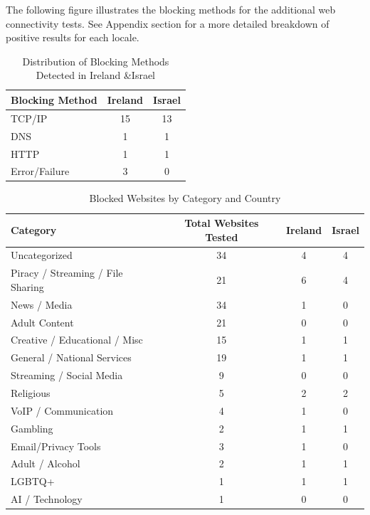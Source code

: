The following figure illustrates the blocking methods for the additional web connectivity tests. See Appendix section for a more detailed breakdown of positive results for each locale.

\begin{table}[H]
\centering
\caption{Distribution of Blocking Methods Detected in Ireland \&Israel}
\begin{tabular}{lcc}
\toprule
\textbf{Blocking Method} & \textbf{Ireland} & \textbf{Israel} \\
\midrule
TCP/IP         & 15 & 13 \\
DNS            & 1  & 1  \\
HTTP           & 1  & 1  \\
Error/Failure  & 3  & 0  \\
\bottomrule
\end{tabular}
\label{tab:blocking_methods_comparison}
\end{table}

\begin{table}[H]
\centering
\caption{Blocked Websites by Category and Country}
\begin{tabular}{lccc}
\toprule
\textbf{Category} & \textbf{Total Websites Tested} & \textbf{Ireland} & \textbf{Israel} \\
\midrule
Uncategorized                      & 34 & 4 & 4 \\
Piracy / Streaming / File Sharing  & 21 & 6 & 4 \\
News / Media                       & 34 & 1 & 0 \\
Adult Content                      & 21 & 0 & 0 \\
Creative / Educational / Misc      & 15 & 1 & 1 \\
General / National Services        & 19 & 1 & 1 \\
Streaming / Social Media           & 9  & 0 & 0 \\
Religious                          & 5  & 2 & 2 \\
VoIP / Communication               & 4  & 1 & 0 \\
Gambling                           & 2  & 1 & 1 \\
Email/Privacy Tools                & 3  & 1 & 0 \\
Adult / Alcohol                    & 2  & 1 & 1 \\
LGBTQ+                             & 1  & 1 & 1 \\
AI / Technology                    & 1  & 0 & 0 \\
\bottomrule
\end{tabular}
\label{tab:category_block}
\end{table}

